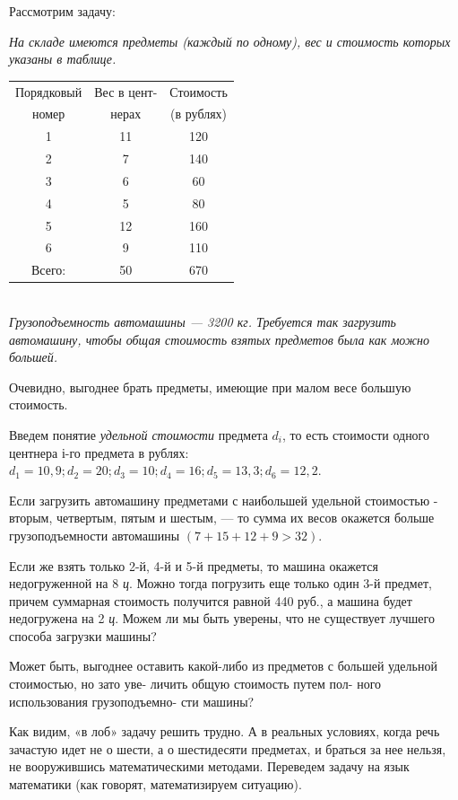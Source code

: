 \documentclass[12pt,twoside]{article}
\begin{document}
\begin{multicols}{2}
Рассмотрим задачу:

\textit{На складе имеются предметы (каждый по одному), вес и стоимость которых указаны в таблице.}
\\

\noindent
\begin{tabular}{c|c|c}
    \hline
    Порядковый&Вес в цент-&Стоимость\\
    номер&нерах&(в рублях)\\
    \hline
    1&11&120\\
    2&7&140\\
    3&6&60\\
    4&5&80\\
    5&12&160\\
    6&9&110\\
    \hline
    Всего:&50&670
\end{tabular}
\\

\textit{Грузоподъемность автомашины — 3200 кг. Требуется так загрузить автомашину, чтобы общая стоимость взятых предметов была как можно большей.}

Очевидно, выгоднее брать предметы, имеющие при малом весе большую стоимость.

Введем понятие \textit{удельной стоимости} предмета $d_i$, то есть стоимости одного центнера $і$-го предмета в рублях: $d_1=10,9; d_2=20; d_3=10; d_4=16; d_5=13,3; d_6=12,2$.

Если загрузить автомашину предметами с наибольшей удельной стоимостью - вторым, четвертым, пятым
и шестым, — то сумма их весов окажется больше грузоподъемности автомашины $(7+15+12+9>32)$.

Если же взять только 2-й, 4-й и 5-й предметы, то машина окажется недогруженной на 8 \textit{ц}. Можно тогда погрузить еще только один 3-й предмет, причем суммарная стоимость получится равной 440 руб., а машина будет недогружена на 2 \textit{ц}. Можем ли мы быть уверены, что не существует лучшего способа загрузки машины?

Может быть, выгоднее оставить какой-либо из предметов с большей удельной стоимостью, но зато уве- личить общую стоимость путем пол- ного использования грузоподъемно-
сти машины?

Как видим, «в лоб» задачу решить трудно. А в реальных условиях, когда речь зачастую идет не о шести, а о шестидесяти предметах, и браться за нее нельзя, не вооружившись математическими методами. Переведем задачу на язык математики (как говорят, математизируем ситуацию).


\end{multicols}
\end{document}

